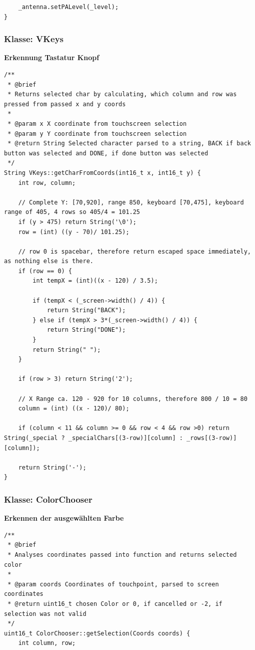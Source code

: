 \documentclass[a4paper, 11pt]{scrartcl}
\begin{document}
\begin{small}
\begin{lstlisting}
    _antenna.setPALevel(_level);
}
\end{lstlisting}

\subsubsection{Klasse: VKeys}
\begin{flushleft}
    \textbf{Erkennung Tastatur Knopf}\label{code:keys}
\end{flushleft}
\begin{lstlisting}
/**
 * @brief 
 * Returns selected char by calculating, which column and row was pressed from passed x and y coords
 * 
 * @param x X coordinate from touchscreen selection
 * @param y Y coordinate from touchscreen selection
 * @return String Selected character parsed to a string, BACK if back button was selected and DONE, if done button was selected
 */
String VKeys::getCharFromCoords(int16_t x, int16_t y) {
    int row, column;

    // Complete Y: [70,920], range 850, keyboard [70,475], keyboard range of 405, 4 rows so 405/4 = 101.25
    if (y > 475) return String('\0');
    row = (int) ((y - 70)/ 101.25);

    // row 0 is spacebar, therefore return escaped space immediately, as nothing else is there.
    if (row == 0) {
        int tempX = (int)((x - 120) / 3.5);

        if (tempX < (_screen->width() / 4)) {
            return String("BACK");
        } else if (tempX > 3*(_screen->width() / 4)) {
            return String("DONE");
        }
        return String(" ");
    }

    if (row > 3) return String('2');

    // X Range ca. 120 - 920 for 10 columns, therefore 800 / 10 = 80
    column = (int) ((x - 120)/ 80);

    if (column < 11 && column >= 0 && row < 4 && row >0) return String(_special ? _specialChars[(3-row)][column] : _rows[(3-row)][column]);
    
    return String('-');
}
\end{lstlisting}

\subsubsection{Klasse: ColorChooser}
\textbf{Erkennen der ausgewählten Farbe}\label{code:color}
\begin{lstlisting}
/**
 * @brief 
 * Analyses coordinates passed into function and returns selected color
 * 
 * @param coords Coordinates of touchpoint, parsed to screen coordinates
 * @return uint16_t chosen Color or 0, if cancelled or -2, if selection was not valid
 */
uint16_t ColorChooser::getSelection(Coords coords) {
    int column, row;


\end{lstlisting}
\end{small}
\end{document}
